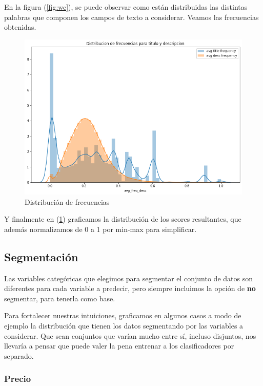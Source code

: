     En la figura (\ref{fig:wc}), se puede observar como están distribuidas las distintas palabras que componen los campos de texto a considerar. Veamos las frecuencias obtenidas. 
    
    \begin{figure}[H]
        \centering
        \includegraphics[scale=0.6]{img/cmp/wc/freq.png}
        \caption{Distribución de frecuencias}
        \label{fig:wc-freq}
    \end{figure}
    
    Y finalmente en (\ref{fig:wc-freq}) graficamos la distribución de los scores resultantes, que además normalizamos de 0 a 1 por min-max para simplificar.
    
    \subsection{Segmentación}
    
    Las variables categóricas que elegimos para segmentar el conjunto de datos son diferentes para cada variable a predecir, pero siempre incluimos la opción de \textbf{no} segmentar, para tenerla como base. 
    
    Para fortalecer nuestras intuiciones, graficamos en algunos casos a modo de ejemplo la distribución que tienen los datos segmentando por las variables a considerar. Que sean conjuntos que varían mucho entre sí, incluso disjuntos, nos llevaría a pensar que puede valer la pena entrenar a los clasificadores por separado.
    
    \subsubsection{Precio}
    
